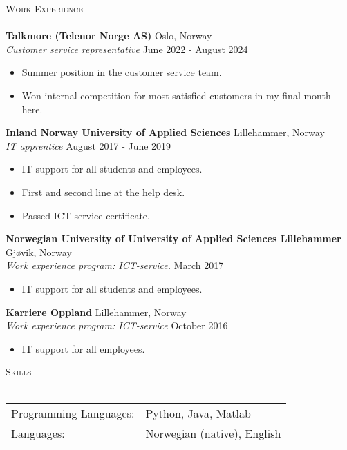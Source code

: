 \documentclass[a4paper]{article}
\newcommand{\lineunder} {
    \vspace*{-8pt} \\
    \hspace*{-18pt} \hrulefill \\
}
\newcommand{\header} [1] {
    {\hspace*{-18pt}\vspace*{6pt} \textsc{#1}}
    \vspace*{-6pt} \lineunder
}
\begin{document}
\header{Work Experience}
\vspace{1mm}
\textbf{Talkmore (Telenor
Norge AS)} \hfill Oslo, Norway\\
\textit{Customer service representative} \hfill June 2022 - August 2024\\
\vspace{-1mm}
\begin{itemize} \itemsep 1pt
	\item Summer position in the customer service team.
	\item Won internal competition for most satisfied customers in my final month here. 
\end{itemize}
\textbf{Inland Norway
University of Applied Sciences} \hfill Lillehammer, Norway\\
\textit{IT apprentice} \hfill August 2017 - June 2019\\
\vspace{-1mm}
\begin{itemize} \itemsep 1pt
	\item IT support for all students and employees.
	\item First and second line at the help desk.
	\item Passed ICT-service certificate.
\end{itemize}
\textbf{Norwegian University of University
of Applied Sciences Lillehammer} \hfill Gjøvik, Norway\\
\textit{Work experience program: ICT-service.} \hfill March 2017\\
\vspace{-1mm}
\begin{itemize} \itemsep 1pt
	\item IT support for all students and employees.
\end{itemize}
\textbf{Karriere Oppland} \hfill Lillehammer, Norway\\
\textit{Work experience program: ICT-service} \hfill October 2016\\
\begin{itemize} \itemsep 1pt
	\item IT support for all employees.
\end{itemize}

\header{Skills}
\begin{tabular}{ l l }
	Programming Languages: & Python, Java, Matlab                            \\
	Languages:             & Norwegian (native), English                                        \\
\end{tabular}
\vspace{2mm}
\end{document}
